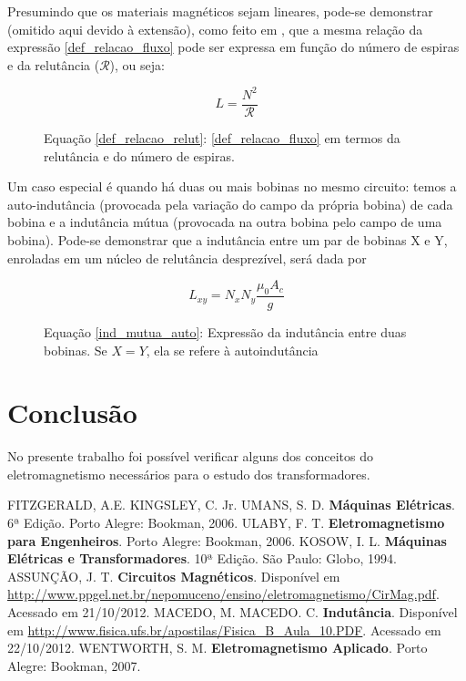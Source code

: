 \documentclass[]{report}
\begin{document}
Presumindo que os materiais magnéticos sejam lineares, pode-se demonstrar (omitido aqui devido à extensão), como feito em \cite{fitzgerald}, que a mesma relação da expressão \ref{def_relacao_fluxo} pode ser expressa em função do número de espiras e da relutância ($\mathcal{R}$), ou seja:

\begin{figure}[!ht]
\begin{equation}
\label{def_relacao_relut}
L = \frac{N^2}{\mathcal{R}}
\end{equation}
\caption*{Equação \ref{def_relacao_relut}: \ref{def_relacao_fluxo} em termos da relutância e do número de espiras.}
\end{figure}

Um caso especial é quando há duas ou mais bobinas no mesmo circuito: temos a auto-indutância (provocada pela variação do campo da própria bobina) de cada bobina e a indutância mútua (provocada na outra bobina pelo campo de uma bobina). Pode-se demonstrar que a indutância entre um par de bobinas X e Y, enroladas em um núcleo de relutância desprezível, será dada por

\begin{figure}
\begin{equation}
\label{ind_mutua_auto}
L_{xy}  = N_x N_y \frac{\mu_0 A_c}{g}
\end{equation}
\caption*{Equação \ref{ind_mutua_auto}: Expressão da indutância entre duas bobinas. Se $X=Y$, ela se refere à autoindutância}
\end{figure}


\chapter{Conclusão}
No presente trabalho foi possível verificar alguns dos conceitos do eletromagnetismo necessários para o estudo dos transformadores. 

\begin{thebibliography}{100}
 FITZGERALD, A.E. KINGSLEY, C. Jr. UMANS, S. D. \textbf{Máquinas Elétricas}. 6ª Edição. Porto Alegre: Bookman, 2006.
 ULABY, F. T. \textbf{Eletromagnetismo para Engenheiros}. Porto Alegre: Bookman, 2006.
 KOSOW, I. L. \textbf{Máquinas Elétricas e Transformadores}. 10ª Edição. São Paulo: Globo, 1994.
 ASSUNÇÃO, J. T. \textbf{Circuitos Magnéticos}. Disponível em \url{http://www.ppgel.net.br/nepomuceno/ensino/eletromagnetismo/CirMag.pdf}. Acessado em 21/10/2012.
 MACEDO, M. MACEDO. C. \textbf{Indutância}. Disponível em \url{http://www.fisica.ufs.br/apostilas/Fisica_B_Aula_10.PDF}. Acessado em 22/10/2012.
 WENTWORTH, S. M. \textbf{Eletromagnetismo Aplicado}. Porto Alegre: Bookman, 2007.
\end{thebibliography}
\end{document}
